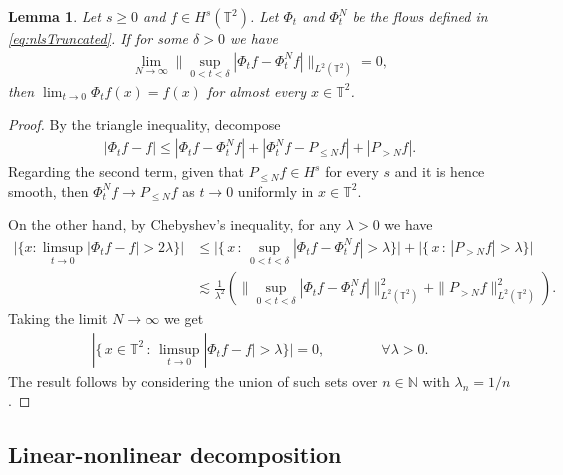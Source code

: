 \documentclass[11pt, xcolor = dvipsnames,reqno
]{amsart}
\newtheorem{lem}[thm]{Lemma}
\theoremstyle{definition}
\theoremstyle{remark}
\begin{document}
\begin{lem}\label{lemma:AdaptMaxEst_NL}
	Let $s \geq 0$ and $f \in  H^{s}(\mathbb{T}^2)$.
    Let $\Phi_t$ and $\Phi_t^N$ be the flows defined in \eqref{eq:nlsTruncated}.
    If for some $\delta  > 0$ we have
	\begin{align}\label{eq:equivconvergence}
		\lim_{N \rightarrow \infty} 
		\Big\| \sup_{0 < t < \delta} 
		| \Phi_t f   - \Phi^N_t f  | \Big\|_{L^2(\mathbb{T}^2)} = 0,
	\end{align}
    then $\lim_{t \to 0} \Phi_t f(x) = f(x)$ for almost every $x \in \mathbb{T}^2$.
\end{lem}
	\begin{proof}
		By the triangle inequality, decompose 
		\begin{align*}
			|\Phi_t f - f | 
            \leq 
            |\Phi_t f - \Phi^{N}_t f| 
            + |\Phi_t^{N} f - P_{\leq N} f| 
            + |P_{>N} f|.
		\end{align*}
        Regarding the second term, given that $P_{\leq N} f \in H^s$ for every $s$ and it is hence smooth, 
        then $\Phi_t^{N} f \rightarrow P_{\leq N} f$ as $t \rightarrow 0$ uniformly in $x \in \mathbb{T}^2$.

        On the other hand, by Chebyshev's inequality, for any $\lambda > 0$ we have
		\begin{align*}
			\big| \big\{ x : \limsup_{t \rightarrow 0} |\Phi_t f - f| > 2\lambda \big\} \big| 
			& \leq \big| \big\{ \, x  \,  : \,  \sup_{0 < t < \delta } 
			|\Phi_t f - \Phi^{N}_t f| > \lambda \big\}\big|  
			+ \big|\big\{ \,  x \,  : \,  |P_{>N} f| > \lambda \big\}\big|  \\ 
			& \lesssim  \frac{1}{\lambda^2} \left( \Big\| \sup_{0 < t < \delta } 
			|\Phi_t f - \Phi^{N}_t f| \Big\|^2_{L^2(\mathbb{T}^2)} 
			+ \| P_{>N}f \|^2_{L^2(\mathbb{T}^2)} \right).
		\end{align*}
		Taking the limit $N \to \infty$ we get 
        \begin{align}
            |\{ \, x  \in \mathbb{T}^2 \, : \, \limsup_{t \rightarrow 0} |\Phi_t f - f| > \lambda  \}| = 0, 
            \qquad \qquad \forall \lambda > 0. 
        \end{align}
        The result follows by considering the union of such sets over $n \in \mathbb N$ with $\lambda_n = 1/n$. 
	\end{proof}
    
    


\subsection{Linear-nonlinear decomposition}
\end{document}
